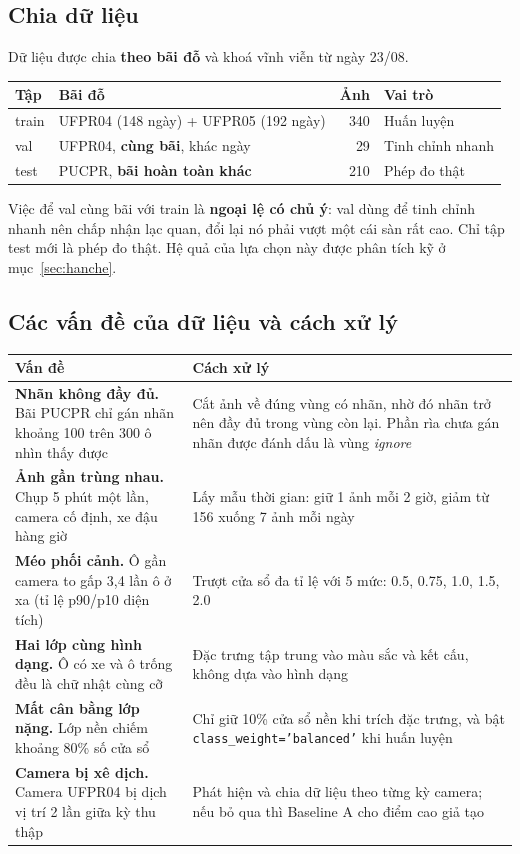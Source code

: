 \documentclass[12pt]{ai_conquer2026}
\begin{document}
\subsection{Chia dữ liệu}

Dữ liệu được chia \textbf{theo bãi đỗ} và khoá vĩnh viễn từ ngày 23/08.

\begin{center}
\begin{tabular}{|l|l|r|l|}
\hline
\textbf{Tập} & \textbf{Bãi đỗ} & \textbf{Ảnh} & \textbf{Vai trò} \\
\hline
train & UFPR04 (148 ngày) + UFPR05 (192 ngày) & 340 & Huấn luyện \\
val & UFPR04, \textbf{cùng bãi}, khác ngày & 29 & Tinh chỉnh nhanh \\
test & PUCPR, \textbf{bãi hoàn toàn khác} & 210 & Phép đo thật \\
\hline
\end{tabular}
\end{center}

Việc để val cùng bãi với train là \textbf{ngoại lệ có chủ ý}: val dùng để tinh chỉnh nhanh nên chấp nhận lạc quan, đổi lại nó phải vượt một cái sàn rất cao. Chỉ tập test mới là phép đo thật. Hệ quả của lựa chọn này được phân tích kỹ ở mục~\ref{sec:hanche}.

\subsection{Các vấn đề của dữ liệu và cách xử lý}

\begin{center}
\begin{tabular}{|p{4.2cm}|p{9.5cm}|}
\hline
\textbf{Vấn đề} & \textbf{Cách xử lý} \\
\hline
\textbf{Nhãn không đầy đủ.} Bãi PUCPR chỉ gán nhãn khoảng 100 trên 300 ô nhìn thấy được & Cắt ảnh về đúng vùng có nhãn, nhờ đó nhãn trở nên đầy đủ trong vùng còn lại. Phần rìa chưa gán nhãn được đánh dấu là vùng \textit{ignore} \\
\hline
\textbf{Ảnh gần trùng nhau.} Chụp 5 phút một lần, camera cố định, xe đậu hàng giờ & Lấy mẫu thời gian: giữ 1 ảnh mỗi 2 giờ, giảm từ 156 xuống 7 ảnh mỗi ngày \\
\hline
\textbf{Méo phối cảnh.} Ô gần camera to gấp 3,4 lần ô ở xa (tỉ lệ p90/p10 diện tích) & Trượt cửa sổ đa tỉ lệ với 5 mức: 0.5, 0.75, 1.0, 1.5, 2.0 \\
\hline
\textbf{Hai lớp cùng hình dạng.} Ô có xe và ô trống đều là chữ nhật cùng cỡ & Đặc trưng tập trung vào màu sắc và kết cấu, không dựa vào hình dạng \\
\hline
\textbf{Mất cân bằng lớp nặng.} Lớp nền chiếm khoảng 80\% số cửa sổ & Chỉ giữ 10\% cửa sổ nền khi trích đặc trưng, và bật \texttt{class\_weight='balanced'} khi huấn luyện \\
\hline
\textbf{Camera bị xê dịch.} Camera UFPR04 bị dịch vị trí 2 lần giữa kỳ thu thập & Phát hiện và chia dữ liệu theo từng kỳ camera; nếu bỏ qua thì Baseline A cho điểm cao giả tạo \\
\hline
\end{tabular}
\end{center}
\end{document}
